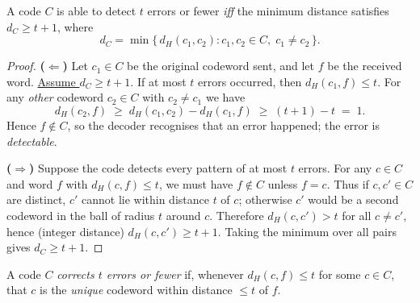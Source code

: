 \documentclass[docmute]{article}
\begin{document}
\begin{theorem}
A code $C$ is able to detect $t$ errors or fewer \emph{iff}
the minimum distance satisfies $d_C\ge t+1$, where
\[
d_C = \min\{\,d_H(c_1,c_2) : c_1,c_2\in C,\; c_1\neq c_2\,\}.
\]
\end{theorem}

\begin{proof}
\textbf{($\Leftarrow$)}\;
Let $c_1\in C$ be the original codeword sent, and let $f$ be the received
word.  \underline{Assume $d_C\ge t+1$}.
If at most $t$ errors occurred, then $d_H(c_1,f)\le t$.  
For any \emph{other} codeword $c_2\in C$ with $c_2\neq c_1$ we have
\[
  d_H(c_2,f)
  \;\ge\;
  d_H(c_1,c_2)-d_H(c_1,f)
  \;\ge\;
  (t+1)-t
  \;=\;
  1.
\]
Hence $f\notin C$, so the decoder recognises that an error happened; the
error is \textit{detectable}.

\begin{center}
\end{center}

\textbf{($\Rightarrow$)}\;
Suppose the code detects every pattern of at most $t$ errors.
For any $c\in C$ and word $f$ with $d_H(c,f)\le t$, we must
have $f\notin C$ unless $f=c$.  
Thus if $c,c'\in C$ are distinct, $c'$ cannot lie within
distance $t$ of $c$; otherwise $c'$ would be a second codeword in the ball
of radius $t$ around $c$.  Therefore $d_H(c,c')>t$ for all $c\neq c'$,
hence (integer distance) $d_H(c,c')\ge t+1$.  Taking the minimum over all
pairs gives $d_C\ge t+1$.
\end{proof}

\bigskip
\begin{definition}
A code $C$ \textit{corrects $t$ errors or fewer} if, whenever
$d_H(c,f)\le t$ for some $c\in C$, that $c$ is the \emph{unique} codeword
within distance $\le t$ of $f$.
\end{definition}
\end{document}
